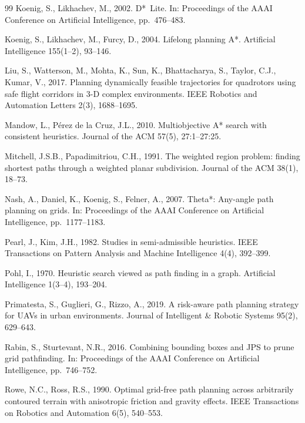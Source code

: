 \documentclass[preprint,12pt,authoryear]{elsarticle}
\begin{document}
\begin{thebibliography}{99}
Koenig, S., Likhachev, M., 2002.
D*~Lite.
In: Proceedings of the AAAI Conference on Artificial Intelligence, pp.\ 476--483.

Koenig, S., Likhachev, M., Furcy, D., 2004.
Lifelong planning A*.
Artificial Intelligence 155(1--2), 93--146.

Liu, S., Watterson, M., Mohta, K., Sun, K., Bhattacharya, S., Taylor, C.J., Kumar, V., 2017.
Planning dynamically feasible trajectories for quadrotors using safe flight corridors in 3-D complex environments.
IEEE Robotics and Automation Letters 2(3), 1688--1695.

Mandow, L., P{\'e}rez de la Cruz, J.L., 2010.
Multiobjective A* search with consistent heuristics.
Journal of the ACM 57(5), 27:1--27:25.

Mitchell, J.S.B., Papadimitriou, C.H., 1991.
The weighted region problem: finding shortest paths through a weighted planar subdivision.
Journal of the ACM 38(1), 18--73.

Nash, A., Daniel, K., Koenig, S., Felner, A., 2007.
Theta*: Any-angle path planning on grids.
In: Proceedings of the AAAI Conference on Artificial Intelligence, pp.\ 1177--1183.

Pearl, J., Kim, J.H., 1982.
Studies in semi-admissible heuristics.
IEEE Transactions on Pattern Analysis and Machine Intelligence 4(4), 392--399.

Pohl, I., 1970.
Heuristic search viewed as path finding in a graph.
Artificial Intelligence 1(3--4), 193--204.

Primatesta, S., Guglieri, G., Rizzo, A., 2019.
A risk-aware path planning strategy for UAVs in urban environments.
Journal of Intelligent \& Robotic Systems 95(2), 629--643.

Rabin, S., Sturtevant, N.R., 2016.
Combining bounding boxes and JPS to prune grid pathfinding.
In: Proceedings of the AAAI Conference on Artificial Intelligence, pp.\ 746--752.

Rowe, N.C., Ross, R.S., 1990.
Optimal grid-free path planning across arbitrarily contoured terrain with anisotropic friction and gravity effects.
IEEE Transactions on Robotics and Automation 6(5), 540--553.


\end{thebibliography}
\end{document}
